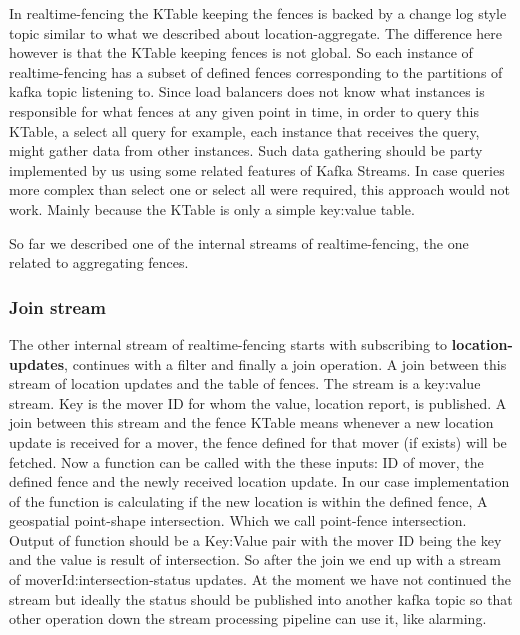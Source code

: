 \documentclass[a4]{report}
\begin{document}
        In realtime-fencing the KTable keeping the fences is backed by a change log style topic similar to what we
        described about location-aggregate.
        The difference here however is that the KTable keeping fences is not global.
        So each instance of realtime-fencing has a subset of defined fences corresponding to the partitions of
        kafka topic listening to.
        Since load balancers does not know what instances is responsible for what fences at any given point in time, in
        order to query this KTable, a select all query for example, each instance that receives the query, might gather
        data from other instances.
        Such data gathering should be party implemented by us using some related features of Kafka Streams.
        In case queries more complex than select one or select all were required, this approach would not work.
        Mainly because the KTable is only a simple key:value table.

        So far we described one of the internal streams of realtime-fencing, the one related to aggregating fences.

        \subsubsection{Join stream}
        The other internal stream of realtime-fencing starts with subscribing to \textbf{location-updates}, continues with a
        filter and finally a join operation.
        A join between this stream of location updates and the table of fences.
        The stream is a key:value stream.
        Key is the mover ID for whom the value, location report, is published.
        A join between this stream and the fence KTable means whenever a new location update is received for a mover,
        the fence defined for that mover (if exists) will be fetched.
        Now a function can be called with the these inputs: ID of mover, the defined fence and the newly received location update.
        In our case implementation of the function is calculating if the new location is within the defined fence, A
        geospatial point-shape intersection.
        Which we call point-fence intersection.
        Output of function should be a Key:Value pair with the mover ID being the key and the value is result of
        intersection.
        So after the join we end up with a stream of moverId:intersection-status updates.
        At the moment we have not continued the stream but ideally the status should be published into another kafka
        topic so that other operation down the stream processing pipeline can use it, like alarming.
\end{document}
